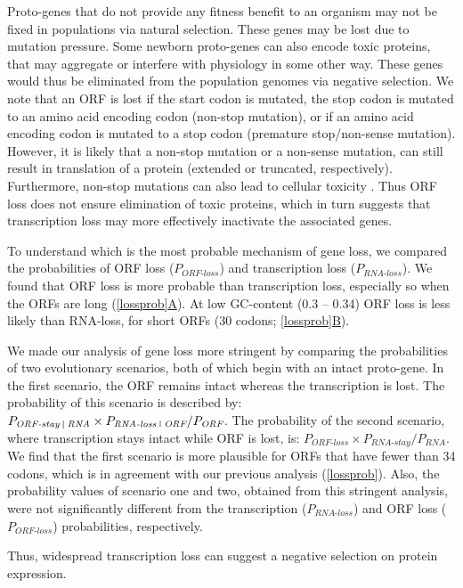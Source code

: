 \documentclass[12pt,a4paper]{article}
\begin{document}
Proto-genes that do not provide any fitness benefit to an organism may not be fixed in populations via natural selection. These genes may be lost due to mutation pressure. Some newborn proto-genes can also encode toxic proteins, that may aggregate or interfere with physiology in some other way. These genes would thus be eliminated from the population genomes via negative selection. We note that an ORF is lost if the start codon is mutated, the stop codon is mutated to an amino acid encoding codon (non-stop mutation), or if an amino acid encoding codon is mutated to a stop codon (premature stop/non-sense mutation). However, it is likely that a non-stop mutation or a non-sense mutation, can still result in translation of a protein (extended or truncated, respectively). Furthermore, non-stop mutations can also lead to cellular toxicity \citep{nonstop}. Thus ORF loss does not ensure elimination of toxic proteins, which in turn suggests that transcription loss may more effectively inactivate the associated genes.

To understand which is the most probable mechanism of gene loss, we compared the probabilities of ORF loss ($P_\textit{ORF-loss}$) and transcription loss ($P_\textit{RNA-loss}$). We found that ORF loss is more probable than transcription loss, especially so when the ORFs are long (\hyperref[lossprob]{\autoref{lossprob}A}). At low GC-content (0.3 -- 0.34) ORF loss is less likely than RNA-loss, for short ORFs (30 codons; \hyperref[lossprob]{\autoref{lossprob}B}).

We made our analysis of gene loss more stringent by comparing the probabilities of two evolutionary scenarios, both of which begin with an intact proto-gene. In the first scenario, the ORF remains intact whereas the transcription is lost. The probability of this scenario is described by: 
$P_\textit{ORF-stay \vline\ RNA} \times P_\textit{RNA-loss \vline\ ORF}/P_\textit{ORF}$. The probability of the second scenario, where transcription stays intact while ORF is lost, is: $P_\textit{ORF-loss} \times P_\textit{RNA-stay}/P_\textit{RNA}$. We find that the first scenario is more plausible for ORFs that have fewer than 34 codons, which is in agreement with our previous analysis (\autoref{lossprob}). Also, the probability values of scenario one and two, obtained from this stringent analysis, were not significantly different from the transcription ($P_\textit{RNA-loss}$) and ORF loss ($P_\textit{ORF-loss}$) probabilities, respectively. 

Thus, widespread transcription loss can suggest a negative selection on protein expression.
\end{document}
